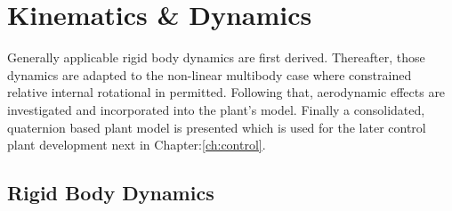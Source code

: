 \chapter{Kinematics \& Dynamics}
\label{ch:dynamics}
Generally applicable rigid body dynamics are first derived. Thereafter, those dynamics are adapted to the non-linear multibody case where constrained relative internal rotational in permitted. Following that, aerodynamic effects are investigated and incorporated into the plant's model. Finally a consolidated, quaternion based plant model is presented which is used for the later control plant development next in Chapter:\ref{ch:control}.
\section{Rigid Body Dynamics}
\label{sec:dynamics.rigidbody}
